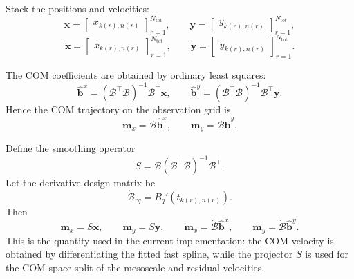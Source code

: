 \documentclass{article}
\begin{document}
Stack the positions and velocities:
\begin{equation}
\mathbf{x}=
\begin{bmatrix}
x_{k(r),n(r)}
\end{bmatrix}_{r=1}^{N_{\mathrm{tot}}},
\qquad
\mathbf{y}=
\begin{bmatrix}
y_{k(r),n(r)}
\end{bmatrix}_{r=1}^{N_{\mathrm{tot}}},
\end{equation}
\begin{equation}
\dot{\mathbf{x}}=
\begin{bmatrix}
\dot{x}_{k(r),n(r)}
\end{bmatrix}_{r=1}^{N_{\mathrm{tot}}},
\qquad
\dot{\mathbf{y}}=
\begin{bmatrix}
\dot{y}_{k(r),n(r)}
\end{bmatrix}_{r=1}^{N_{\mathrm{tot}}}.
\end{equation}

The COM coefficients are obtained by ordinary least squares:
\begin{equation}
\hat{\mathbf{b}}^x=(\mathcal{B}^{\top}\mathcal{B})^{-1}\mathcal{B}^{\top}\mathbf{x},
\qquad
\hat{\mathbf{b}}^y=(\mathcal{B}^{\top}\mathcal{B})^{-1}\mathcal{B}^{\top}\mathbf{y}.
\end{equation}
Hence the COM trajectory on the observation grid is
\begin{equation}
\mathbf{m}_x=\mathcal{B}\hat{\mathbf{b}}^x,
\qquad
\mathbf{m}_y=\mathcal{B}\hat{\mathbf{b}}^y.
\end{equation}

Define the smoothing operator
\begin{equation}
S=\mathcal{B}(\mathcal{B}^{\top}\mathcal{B})^{-1}\mathcal{B}^{\top}.
\label{eq:S_operator}
\end{equation}
Let the derivative design matrix be
\begin{equation}
\dot{\mathcal{B}}_{rq}=B_q'\!\left(t_{k(r),n(r)}\right).
\end{equation}
Then
\begin{equation}
\mathbf{m}_x=S\mathbf{x},
\qquad
\mathbf{m}_y=S\mathbf{y},
\qquad
\dot{\mathbf{m}}_x=\dot{\mathcal{B}}\hat{\mathbf{b}}^x,
\qquad
\dot{\mathbf{m}}_y=\dot{\mathcal{B}}\hat{\mathbf{b}}^y.
\label{eq:S_com_relation}
\end{equation}
This is the quantity used in the current implementation: the COM velocity is obtained by
differentiating the fitted fast spline, while the projector $S$ is used for the COM-space
split of the mesoscale and residual velocities.
\end{document}
